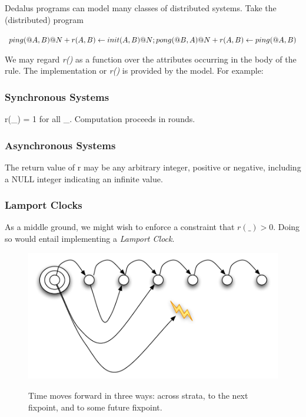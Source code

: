 \documentclass{acm_proc_article-sp-sigmod09}
\begin{document}
Dedalus programs can model many classes of distributed systems.  Take the (distributed) program

$
ping(@A, B)@N + r(A, B) \leftarrow \\
init(A, B)@N; \\
\\
pong(@B, A)@N + r(A, B) \leftarrow \\
ping(@A, B)
$

We may regard  \emph{r()} as a function over the attributes occurring in the body of the rule.  The implementation or \emph{r()} is provided by
the model.  For example:

\subsubsection{Synchronous Systems}

r(\_) = 1 for all \_.  Computation proceeds in rounds.

\subsubsection{Asynchronous Systems}

The return value of r may be any arbitrary integer, positive or negative, including a NULL integer indicating an infinite value.

\subsubsection{Lamport Clocks}

As a middle ground, we might wish to enforce a constraint that $r(\_) > 0$.  Doing so would entail implementing a \emph{Lamport Clock}.

\begin{figure}[t]
  \centering
  \includegraphics[width=0.75\linewidth]{dedalus-time.pdf}
  \label{fig:dedalus-time}
  \caption{Time moves forward in three ways: across strata, to the next fixpoint, and to some future fixpoint.}
\vspace{-8pt}
\end{figure}
\end{document}
